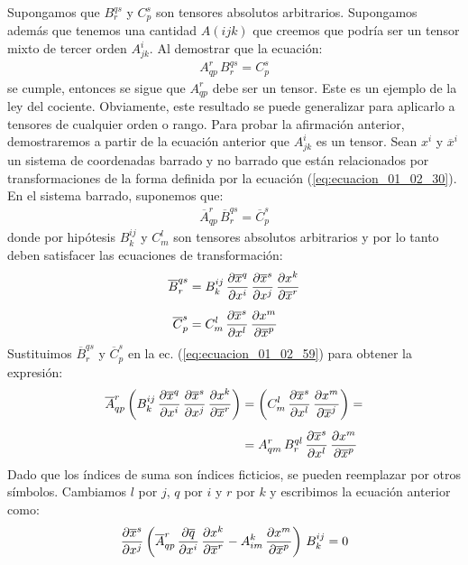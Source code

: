 \documentclass[hidelinks,12pt]{article}
\begin{document}
Supongamos que $B_{r}^{qs}$ y $C_{p}^{s}$ son tensores absolutos arbitrarios. Supongamos además que tenemos una cantidad $A (ijk)$ que creemos que podría ser un tensor mixto de tercer orden $A_{jk}^{i}$. Al demostrar que la ecuación:
\begin{align*}
A_{qp}^{r} \, B_{r}^{qs} = C_{p}^{s}
\end{align*}
se cumple, entonces se sigue que $A_{qp}^{r}$ debe ser un tensor. Este es un ejemplo de la ley del cociente. Obviamente, este resultado se puede generalizar para aplicarlo a tensores de cualquier orden o rango. Para probar la afirmación anterior, demostraremos a partir de la ecuación anterior que $A_{jk}^{i}$ es un tensor. Sean $x^{i}$ y $\overline{x}^{i}$ un sistema de coordenadas barrado y no barrado que están relacionados por transformaciones de la forma definida por la ecuación (\ref{eq:ecuacion_01_02_30}). En el sistema barrado, suponemos que:
\begin{align}
\overline{A}_{qp}^{r} \, \overline{B}_{r}^{qs} = \overline{C}_{p}^{s}
\label{eq:ecuacion_01_02_59}
\end{align}
donde por hipótesis $B_{k}^{ij}$ y $C_{m}^{l}$ son tensores absolutos arbitrarios y por lo tanto deben satisfacer las ecuaciones de transformación:
\begin{align*}
\overline{B}_{r}^{qs} &= B_{k}^{ij} \, \pdv{\overline{x}^{q}}{x^{i}} \, \pdv{\overline{x}^{s}}{x^{j}} \, \pdv{x^{k}}{\overline{x}^{r}} \\[0.5em]
\overline{C}_{p}^{s} &= C_{m}^{l} \, \pdv{\overline{x}^{s}}{x^{l}} \, \pdv{x^{m}}{\overline{x}^{p}}
\end{align*}
Sustituimos $\overline{B}_{r}^{qs}$ y $\overline{C}_{p}^{s}$ en la ec. (\ref{eq:ecuacion_01_02_59}) para obtener la expresión:
\begin{align*}
\overline{A}_{qp}^{r} \left( B_{k}^{ij} \, \pdv{\overline{x}^{q}}{x^{i}} \, \pdv{\overline{x}^{s}}{x^{j}} \, \pdv{x^{k}}{\overline{x}^{r}} \right) &= \left( C_{m}^{l} \, \pdv{\overline{x}^{s}}{x^{l}} \, \pdv{x^{m}}{\overline{x}^{j}} \right) = \\[0.5em]
&= A_{qm}^{r} \, B_{r}^{ql} \, \pdv{\overline{x}^{s}}{x^{l}} \, \pdv{x^{m}}{\overline{x}^{p}}
\end{align*}
Dado que los índices de suma son índices ficticios, se pueden reemplazar por otros símbolos. Cambiamos $l$ por $j$, $q$ por $i$ y $r$ por $k$ y escribimos la ecuación anterior como:
\begin{align*}
\pdv{\overline{x}^{s}}{x^{j}} \left( \overline{A}_{qp}^{r} \, \pdv{\overline{q}}{x^{i}} \, \pdv{x^{k}}{\overline{x}^{r}} - A_{im}^{k} \, \pdv{x^{m}}{\overline{x}^{p}} \right) \, B_{k}^{ij} = 0
\end{align*}
\end{document}
